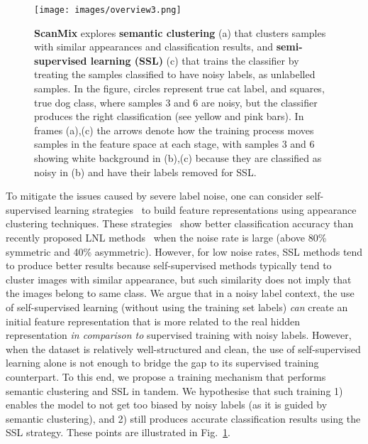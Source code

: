 \documentclass[review]{elsarticle}
\theoremstyle{plain}
\begin{document}
\begin{figure}[t]
\centering
  \texttt{[image: images/overview3.png]}
  \caption{\textbf{ScanMix} explores \textbf{semantic clustering} (a) that clusters samples with similar appearances and classification results, and \textbf{semi-supervised learning (SSL)} (c) that trains the classifier by treating the samples classified to have noisy labels, as unlabelled samples.  In the figure, circles represent true cat label, and squares, true dog class, where samples 3 and 6 are noisy, but the classifier produces the right classification (see yellow and pink bars). In frames (a),(c) the arrows denote how the training process moves samples in the feature space at each stage, with samples 3 and 6 showing white background in (b),(c) because they are classified as noisy in (b) and have their labels removed for SSL.}
  \label{fig:motivation}
\end{figure}

To mitigate the issues caused by severe label noise, one can consider self-supervised learning strategies~\citep{MoCo,MoCoV2,SCAN,SimCLR} to build feature representations 
using appearance clustering techniques. 
These strategies~\citep{MoCo,MoCoV2,SCAN,SimCLR} show better classification accuracy than recently proposed LNL methods~\citep{li2020dividemix,SELF} when the noise rate is large (above 80\% symmetric and 40\% asymmetric). However, for low noise rates, SSL methods tend to produce better results because self-supervised methods typically tend to cluster images with similar appearance, but such similarity does not imply that the images belong to same class. 
We argue that in a noisy label context, the use of self-supervised learning (without using the training set labels) \textit{can} create an initial feature representation that is more related to the real hidden representation \textit{in comparison to} supervised training with noisy labels. However, when the dataset is relatively well-structured and clean, the use of self-supervised learning alone is not enough to bridge the gap to its supervised training counterpart. 
To this end, we propose a training mechanism that performs semantic clustering and SSL in tandem. 
We hypothesise that such training  1) enables the model to not get too biased by noisy labels (as it is guided by semantic clustering), and 2) still produces accurate classification results using the SSL strategy. These points are illustrated in Fig.~\ref{fig:motivation}.
\end{document}
